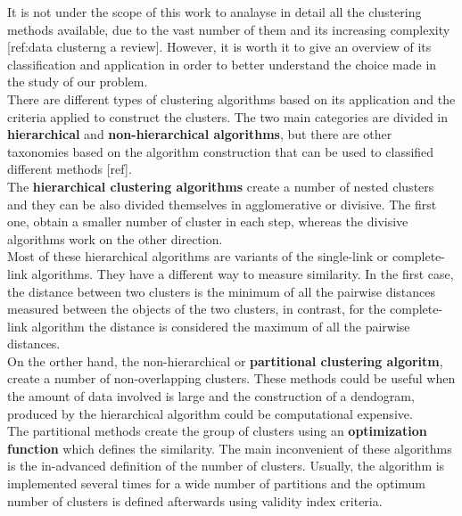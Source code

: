 It is not under the scope of this work to analayse in detail all the clustering methods available, due to the vast number of them and its increasing complexity [ref:data clusterng a review]. However, it is worth it to give an overview of its classification and application in order to better understand the choice made in the study of our problem.\\

There are different types of clustering algorithms based on its application and the criteria applied to construct the clusters. The two main categories are divided in \textbf{hierarchical} and \textbf{non-hierarchical algorithms}, but there are other taxonomies based on the algorithm construction that can be used to classified different methods [ref].\\

The \textbf{hierarchical clustering algorithms} create a number of nested clusters and they can be also divided themselves in agglomerative or divisive. The first one, obtain a smaller number of cluster in each step, whereas the divisive algorithms work on the other direction.\\

Most of these hierarchical algorithms are variants of the single-link or complete-link algorithms. They have a different way to measure similarity. In the first case, the distance between two clusters is the minimum of all the pairwise distances measured between the objects of the two clusters, in contrast, for the complete-link algorithm the distance is considered the maximum of all the pairwise distances.\\

On the orther hand, the non-hierarchical or \textbf{partitional clustering algoritm}, create a number of non-overlapping clusters. These methods could be useful when the amount of data involved is large and the construction of a dendogram, produced by the hierarchical algorithm could be computational expensive.\\

The partitional methods create the group of clusters using an \textbf{optimization function} which defines the similarity. The main inconvenient of these algorithms is the in-advanced definition of the number of clusters. Usually, the algorithm is implemented several times for a wide number of partitions and the optimum number of clusters is defined afterwards using validity index criteria.\\



